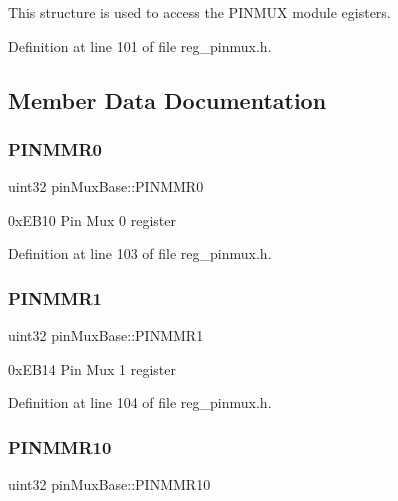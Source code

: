 This structure is used to access the P\+I\+N\+M\+UX module egisters. 

Definition at line 101 of file reg\+\_\+pinmux.\+h.



\subsection{Member Data Documentation}
\mbox{\label{structpinMuxBase_a5b72df26e548e7eab5e2adbfef85ebda}} 
\subsubsection{\texorpdfstring{P\+I\+N\+M\+M\+R0}{PINMMR0}}
{\footnotesize\ttfamily uint32 pin\+Mux\+Base\+::\+P\+I\+N\+M\+M\+R0}

0x\+E\+B10 Pin Mux 0 register 

Definition at line 103 of file reg\+\_\+pinmux.\+h.

\mbox{\label{structpinMuxBase_ae365059d897a6eeb77f969ede5651df1}} 
\subsubsection{\texorpdfstring{P\+I\+N\+M\+M\+R1}{PINMMR1}}
{\footnotesize\ttfamily uint32 pin\+Mux\+Base\+::\+P\+I\+N\+M\+M\+R1}

0x\+E\+B14 Pin Mux 1 register 

Definition at line 104 of file reg\+\_\+pinmux.\+h.

\mbox{\label{structpinMuxBase_af5c8dcc8b70f427ad69423407f876f96}} 
\subsubsection{\texorpdfstring{P\+I\+N\+M\+M\+R10}{PINMMR10}}
{\footnotesize\ttfamily uint32 pin\+Mux\+Base\+::\+P\+I\+N\+M\+M\+R10}

